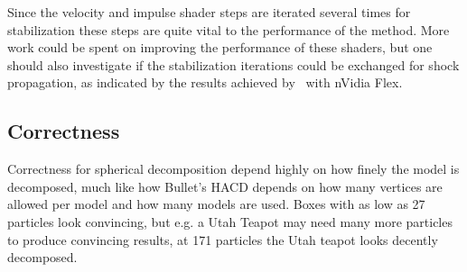 Since the velocity and impulse shader steps are iterated
several times for stabilization these steps are quite vital to the performance
of the method. More work could be spent on improving the performance of these shaders,
but one should also investigate if the stabilization iterations could be exchanged for
shock propagation, as indicated by the results achieved by~\cite{flex} with nVidia Flex.

\subsection{Correctness}
Correctness for spherical decomposition depend highly on how finely the model is
decomposed, much like how Bullet's HACD depends on how many vertices are allowed
per model and how many models are used. Boxes with as low as 27 particles look convincing, but e.g. a Utah Teapot
may need many more particles to produce convincing results, at 171 particles the
Utah teapot looks decently decomposed.
